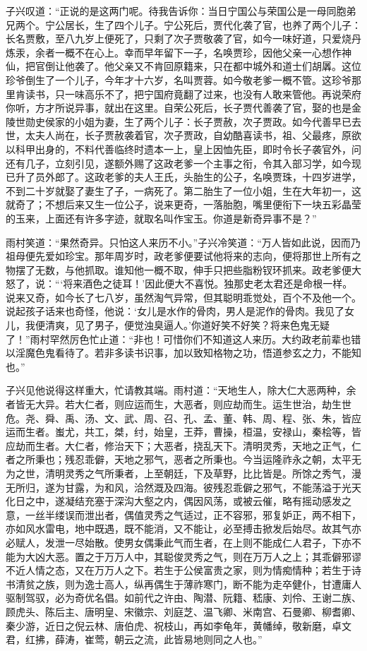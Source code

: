 子兴叹道：“正说的是这两门呢。待我告诉你：当日宁国公与荣国公是一母同胞弟兄两个。宁公居长，生了四个儿子。宁公死后，贾代化袭了官，也养了两个儿子：长名贾敷，至八九岁上便死了，只剩了次子贾敬袭了官，如今一味好道，只爱烧丹炼汞，余者一概不在心上。幸而早年留下一子，名唤贾珍，因他父亲一心想作神仙，把官倒让他袭了。他父亲又不肯回原籍来，只在都中城外和道士们胡羼。这位珍爷倒生了一个儿子，今年才十六岁，名叫贾蓉。如今敬老爹一概不管。这珍爷那里肯读书，只一味高乐不了，把宁国府竟翻了过来，也没有人敢来管他。再说荣府你听，方才所说异事，就出在这里。自荣公死后，长子贾代善袭了官，娶的也是金陵世勋史侯家的小姐为妻，生了两个儿子：长子贾赦，次子贾政。如今代善早已去世，太夫人尚在，长子贾赦袭着官，次子贾政，自幼酷喜读书，祖、父最疼，原欲以科甲出身的，不料代善临终时遗本一上，皇上因恤先臣，即时令长子袭官外，问还有几子，立刻引见，遂额外赐了这政老爹一个主事之衔，令其入部习学，如今现已升了员外郎了。这政老爹的夫人王氏，头胎生的公子，名唤贾珠，十四岁进学，不到二十岁就娶了妻生了子，一病死了。第二胎生了一位小姐，生在大年初一，这就奇了；不想后来又生一位公子，说来更奇，一落胎胞，嘴里便衔下一块五彩晶莹的玉来，上面还有许多字迹，就取名叫作宝玉。你道是新奇异事不是？”

雨村笑道：“果然奇异。只怕这人来历不小。”子兴冷笑道：“万人皆如此说，因而乃祖母便先爱如珍宝。那年周岁时，政老爹便要试他将来的志向，便将那世上所有之物摆了无数，与他抓取。谁知他一概不取，伸手只把些脂粉钗环抓来。政老爹便大怒了，说：“‘将来酒色之徒耳！’因此便大不喜悦。独那史老太君还是命根一样。说来又奇，如今长了七八岁，虽然淘气异常，但其聪明乖觉处，百个不及他一个。说起孩子话来也奇怪，他说：‘女儿是水作的骨肉，男人是泥作的骨肉。我见了女儿，我便清爽，见了男子，便觉浊臭逼人。’你道好笑不好笑？将来色鬼无疑了！”雨村罕然厉色忙止道：“非也！可惜你们不知道这人来历。大约政老前辈也错以淫魔色鬼看待了。若非多读书识事，加以致知格物之功，悟道参玄之力，不能知也。”

子兴见他说得这样重大，忙请教其端。雨村道：“天地生人，除大仁大恶两种，余者皆无大异。若大仁者，则应运而生，大恶者，则应劫而生。运生世治，劫生世危。尧、舜、禹、汤、文、武、周、召、孔、孟、董、韩、周、程、张、朱，皆应运而生者。蚩尤，共工，桀，纣，始皇，王莽，曹操，桓温，安禄山，秦桧等，皆应劫而生者。大仁者，修治天下；大恶者，挠乱天下。清明灵秀，天地之正气，仁者之所秉也；残忍乖僻，天地之邪气，恶者之所秉也。今当运隆祚永之朝，太平无为之世，清明灵秀之气所秉者，上至朝廷，下及草野，比比皆是。所馀之秀气，漫无所归，遂为甘露，为和风，洽然溉及四海。彼残忍乖僻之邪气，不能荡溢于光天化日之中，遂凝结充塞于深沟大壑之内，偶因风荡，或被云催，略有摇动感发之意，一丝半缕误而泄出者，偶值灵秀之气适过，正不容邪，邪复妒正，两不相下，亦如风水雷电，地中既遇，既不能消，又不能让，必至搏击掀发后始尽。故其气亦必赋人，发泄一尽始散。使男女偶秉此气而生者，在上则不能成仁人君子，下亦不能为大凶大恶。置之于万万人中，其聪俊灵秀之气，则在万万人之上；其乖僻邪谬不近人情之态，又在万万人之下。若生于公侯富贵之家，则为情痴情种；若生于诗书清贫之族，则为逸士高人，纵再偶生于薄祚寒门，断不能为走卒健仆，甘遭庸人驱制驾驭，必为奇优名倡。如前代之许由、陶潜、阮籍、嵇康、刘伶、王谢二族、顾虎头、陈后主、唐明皇、宋徽宗、刘庭芝、温飞卿、米南宫、石曼卿、柳耆卿、秦少游，近日之倪云林、唐伯虎、祝枝山，再如李龟年，黄幡绰，敬新磨，卓文君，红拂，薛涛，崔莺，朝云之流，此皆易地则同之人也。”

